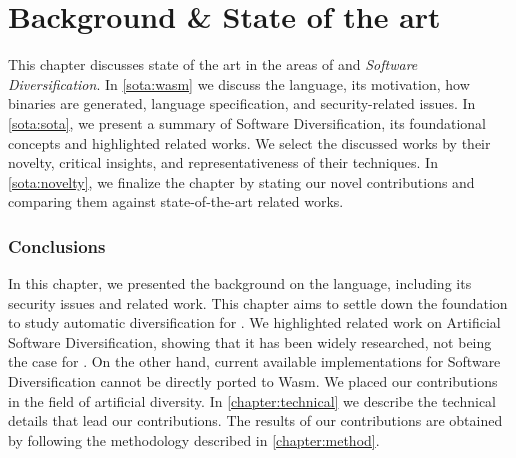 \chapter{Background \& State of the art}

This chapter discusses state of the art in the areas of \emph{\wasm} and \emph{Software Diversification}. In \autoref{sota:wasm} we discuss the \wasm language, its motivation, how \wasm binaries are generated, language specification, and security-related issues. In \autoref{sota:sota}, we present a summary of Software Diversification, its foundational concepts and highlighted related works.  
We select the discussed works by their novelty, critical insights, and representativeness of their techniques. 
In \autoref{sota:novelty}, we finalize the chapter by stating our novel contributions and comparing them against state-of-the-art related works.







\subsection*{Conclusions}
In this chapter, we presented the background on the \wasm language, including its security issues and related work.
This chapter aims to settle down the foundation to study automatic diversification for \wasm. 
We highlighted related work on Artificial Software Diversification, showing that it has been widely researched, not being the case for \wasm. 
On the other hand, current available implementations for Software Diversification cannot be directly ported to Wasm. 
We placed our contributions in the field of artificial diversity. 
In \autoref{chapter:technical} we describe the technical details that lead our contributions. 
The results of our contributions are obtained by following the methodology described in \autoref{chapter:method}.

